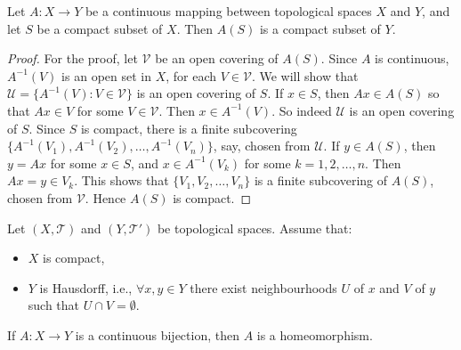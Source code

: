 

\begin{theorem}
Let \( A: X \to Y \) be a continuous mapping between topological spaces \( X \) and \( Y \), and let \( S \) be a compact subset of \( X \). Then \( A(S) \) is a compact subset of \( Y \).
\end{theorem}

\begin{proof}
For the proof, let \( \mathcal{V} \) be an open covering of \( A(S) \). Since \( A \) is continuous, \( A^{-1}(V) \) is an open set in \( X \), for each \( V \in \mathcal{V} \). We will show that \( \mathcal{U} = \{ A^{-1}(V) : V \in \mathcal{V} \} \) is an open covering of \( S \). If \( x \in S \), then \( Ax \in A(S) \) so that \( Ax \in V \) for some \( V \in \mathcal{V} \). Then \( x \in A^{-1}(V) \). So indeed \( \mathcal{U} \) is an open covering of \( S \). Since \( S \) is compact, there is a finite subcovering \( \{ A^{-1}(V_1), A^{-1}(V_2), \ldots, A^{-1}(V_n) \} \), say, chosen from \( \mathcal{U} \). If \( y \in A(S) \), then \( y = Ax \) for some \( x \in S \), and \( x \in A^{-1}(V_k) \) for some \( k = 1, 2, \ldots, n \). Then \( Ax = y \in V_k \). This shows that \( \{ V_1, V_2, \ldots, V_n \} \) is a finite subcovering of \( A(S) \), chosen from \( \mathcal{V} \). Hence \( A(S) \) is compact.
\end{proof}



\begin{theorem}
Let \((X,\mathcal{T})\) and \((Y,\mathcal{T}')\) be topological spaces. Assume that:
\begin{itemize}
    \item \(X\) is compact,
    \item \(Y\) is Hausdorff, i.e., \(\forall x, y \in Y\) there exist neighbourhoods \(U\) of \(x\) and \(V\) of \(y\) such that \(U \cap V = \emptyset\).
\end{itemize}
If \(A: X \to Y\) is a continuous bijection, then \(A\) is a homeomorphism.
\end{theorem}

